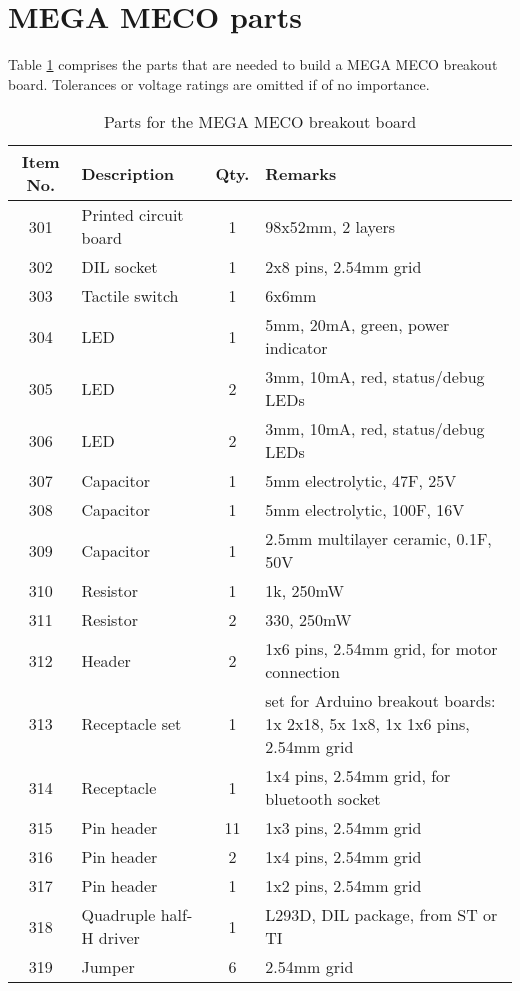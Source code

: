 \documentclass[10pt,a4paper]{article}
\begin{document}
\section{MEGA MECO parts}
Table \ref{parts_megameco} comprises the parts that are needed to build a MEGA MECO breakout board. Tolerances or voltage ratings are omitted if of no importance.
\begin{table}[h]
	\centering
	\begin{tabular}{| c | l | c | l|}
		\hline
		Item No. & Description & Qty. & Remarks \\ \hline
		301 & Printed circuit board & 1 & \footnotesize 98x52mm, 2 layers \\ \hline
		302 & DIL socket & 1 & \footnotesize 2x8 pins, 2.54mm grid \\ \hline
		303 & Tactile switch & 1 & \footnotesize 6x6mm \\ \hline
		304& LED & 1 & \footnotesize 5mm, 20mA, green, power indicator\\ \hline
		305& LED & 2 & \footnotesize 3mm, 10mA, red, status/debug LEDs\\ \hline
		306& LED & 2 & \footnotesize 3mm, 10mA, red, status/debug LEDs\\ \hline
		307& Capacitor & 1 & \footnotesize 5mm electrolytic, 47\textmu F, 25V\\ \hline
		308& Capacitor & 1 & \footnotesize 5mm electrolytic, 100\textmu F, 16V\\ \hline
		309& Capacitor & 1 & \footnotesize 2.5mm multilayer ceramic, 0.1\textmu F, 50V\\ \hline
		310& Resistor & 1 & \footnotesize 1k\ohm, 250mW\\ \hline
		311& Resistor & 2 & \footnotesize 330\ohm, 250mW\\ \hline
		312& Header & 2 & \footnotesize 1x6 pins, 2.54mm grid, for motor connection\\ \hline
		313& Receptacle set & 1 & \begin{minipage}{7cm}
			\footnotesize set for Arduino breakout boards: 1x 2x18, 5x 1x8, 1x 1x6 pins, 2.54mm grid
		\end{minipage}\\ \hline
		314& Receptacle & 1 & \footnotesize 1x4 pins, 2.54mm grid, for bluetooth socket\\ \hline
		315& Pin header & 11 & \footnotesize 1x3 pins, 2.54mm grid\\ \hline
		316& Pin header & 2 & \footnotesize 1x4 pins, 2.54mm grid\\ \hline
		317& Pin header & 1 & \footnotesize 1x2 pins, 2.54mm grid\\ \hline
		318& Quadruple half-H driver & 1 & \footnotesize L293D, DIL package, from ST or TI\\ \hline
		319& Jumper & 6 & \footnotesize 2.54mm grid\\ \hline
	\end{tabular}
	\caption{Parts for the MEGA MECO breakout board}\label{parts_megameco}
\end{table}
\end{document}
